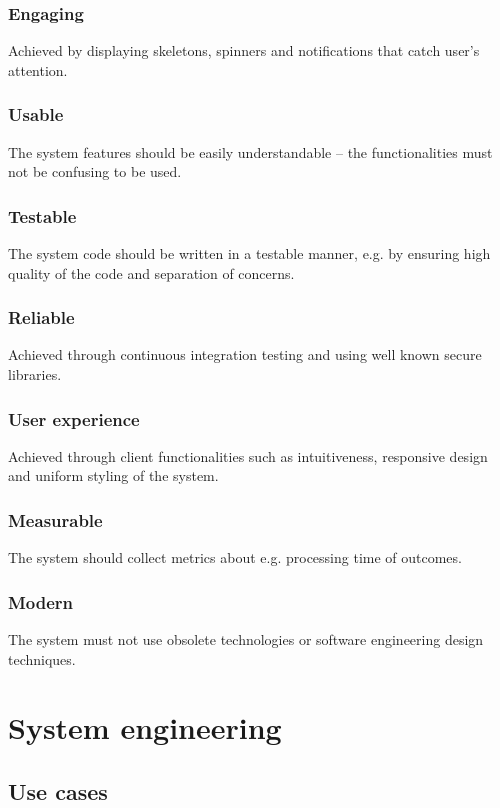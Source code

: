 \documentclass[a4paper,twoside,12pt]{book}
\begin{document}
\subsubsection{Engaging}
Achieved by displaying skeletons, spinners and notifications that catch user's attention.

\subsubsection{Usable}
The system features should be easily understandable – the functionalities must not be confusing to be used.

\subsubsection{Testable}
The system code should be written in a testable manner, e.g. by ensuring high quality of the code and separation of concerns.

\subsubsection{Reliable}
Achieved through continuous integration testing and using well known secure libraries.

\subsubsection{User experience}
Achieved through client functionalities such as intuitiveness, responsive design and uniform styling of the system.

\subsubsection{Measurable} 
The system should collect metrics about e.g. processing time of outcomes.

\subsubsection{Modern}
The system must not use obsolete technologies or software engineering design techniques.

\section{System engineering}
\subsection{Use cases}
\end{document}
